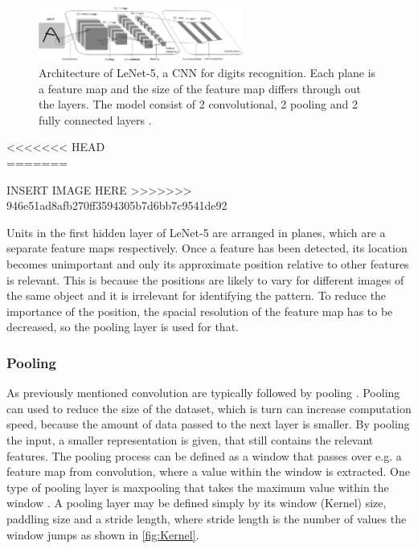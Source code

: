\\
\begin{figure} [H]
\centering
\includegraphics[width=0.6\textwidth]{figures/LeNet5}
\caption{Architecture of LeNet-5, a CNN for digits recognition. Each plane is a feature map and the size of the feature map differs through out the layers. The model consist of 2 convolutional, 2 pooling and 2 fully connected layers \citep{LeCun1998}.}
\label{fig:LeNet5}  
\end{figure}
<<<<<<< HEAD
\\
=======

\noindent
INSERT IMAGE HERE
>>>>>>> 946e51ad8afb270ff3594305b7d6bb7c9541de92


Units in the first hidden layer of LeNet-5 are arranged in planes, which are a separate feature maps respectively. Once a feature has been detected, its location becomes unimportant and only its approximate position relative to other features is relevant. This is because the positions are likely to vary for different images of the same object and it is irrelevant for identifying the pattern. To reduce the importance of the position, the spacial resolution of the feature map has to be decreased, so the pooling layer is used for that.\citep{LeCun1998}



\subsubsection{Pooling}
As previously mentioned convolution are typically followed by pooling \citep{LeCun2015, Goodfellow0216}. 
Pooling can used to reduce the size of the dataset, which is turn can increase computation speed, because the amount of data passed to the next layer is smaller. By pooling the input, a smaller representation is given, that still contains the relevant features.\citep{Goodfellow2016,LeCun1998}     
The pooling process can be defined as a window that passes over e.g. a feature map from convolution, where a value within the window is extracted. One type of pooling layer is maxpooling that takes the maximum value within the window \citep{Goodfellow2016,Dumoulin2016}. A pooling layer may be defined simply by its window (Kernel) size, paddling size and a stride length, where stride length is the number of values the window jumps as shown in \autoref{fig:Kernel}. \citep{Dumoulin2016}


